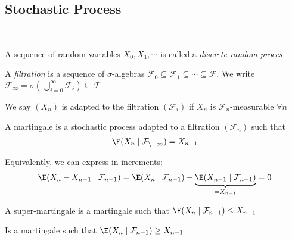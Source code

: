 \subsection{Stochastic Process}\hfill\\
\par\bigskip
\begin{defo}{}
  A sequence of random variables $X_0,X_1,\cdots$ is called a \textit{discrete random proces}
\end{defo}
\par\bigskip
\begin{defo}[Filtration]{}
  A \textit{filtration} is a sequence of $\sigma$-algebras $\mathcal{F}_0\subseteq\mathcal{F}_1\subseteq\cdots\subseteq\mathcal{F}$. We write $\mathcal{F}_\infty = \sigma\left(\bigcup_{i=0}^{\infty}\mathcal{F_i}\right)\subseteq\mathcal{F}$
\end{defo}
\par\bigskip
\begin{defo}{}
  We say $(X_n)$ is adapted to the filtration $(\mathcal{F}_i)$ if $X_n$ is $\mathcal{F}_n$-measurable $\forall n$
\end{defo}
\par\bigskip
\begin{defo}[Martingale]{}
  A martingale is a stochastic process adapted to a filtration $(\mathcal{F}_n)$ such that
  \begin{equation*}
    \begin{gathered}
      \E(X_n\mid\mathcal{F_{n-1}}) = X_{n-1}
    \end{gathered}
  \end{equation*}
  \par\bigskip
  \noindent Equivalently, we can express in increments:
  \begin{equation*}
    \begin{gathered}
      \E(X_{n}-X_{n-1}\mid\mathcal{F}_{n-1}) = \E(X_n\mid\mathcal{F}_{n-1})-\underbrace{\E(X_{n-1}\mid\mathcal{F}_{n-1})}_{=X_{n-1}} = 0
    \end{gathered}
  \end{equation*}
\end{defo}
\par\bigskip
\begin{defo}{}
  A super-martingale is a martingale such that $\E(X_n\mid\mathcal{F}_{n-1})\leq X_{n-1}$
\end{defo}
\par\bigskip
\begin{defo}{}
  Is a martingale such that $\E(X_n\mid\mathcal{F}_{n-1})\geq X_{n-1}$
\end{defo}
